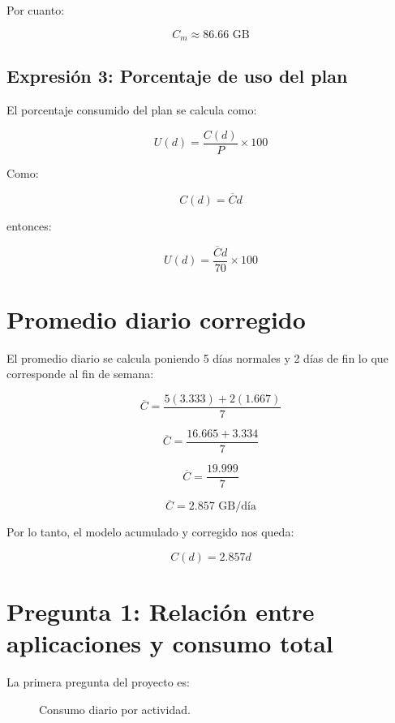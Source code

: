 \documentclass[12pt,a4paper]{article}
\begin{document}
	Por cuanto:
	
	\[
	\boxed{C_m\approx 86.66\text{ GB}}
	\]
	
	\subsection{Expresión 3: Porcentaje de uso del plan}
	
	El porcentaje consumido del plan se calcula como:
	
	\[
	U(d)=\frac{C(d)}{P}\times 100
	\]
	
	Como:
	
	\[
	C(d)=\overline{C}d
	\]
	
	entonces:
	
	\[
	U(d)=\frac{\overline{C}d}{70}\times100
	\]
	\section{Promedio diario corregido}
	
	El promedio diario se calcula poniendo 5 días normales y 2 días de fin lo que corresponde al fin de semana:
	
	\[
	\overline{C}=\frac{5(3.333)+2(1.667)}{7}
	\]
	
	\[
	\overline{C}=\frac{16.665+3.334}{7}
	\]
	
	\[
	\overline{C}=\frac{19.999}{7}
	\]
	
	\[
	\overline{C}=2.857\text{ GB/día}
	\]
	
	Por lo tanto, el modelo acumulado y corregido nos queda:
	
	\[
	\boxed{C(d)=2.857d}
	\]
	
	\section{Pregunta 1: Relación entre aplicaciones y consumo total}
	
	La primera pregunta del proyecto es:
	
	\begin{quote}
	\end{quote}
	
	\begin{figure}[H]
		\centering
		\caption{Consumo diario por actividad.}
	\end{figure}
	
\end{document}
